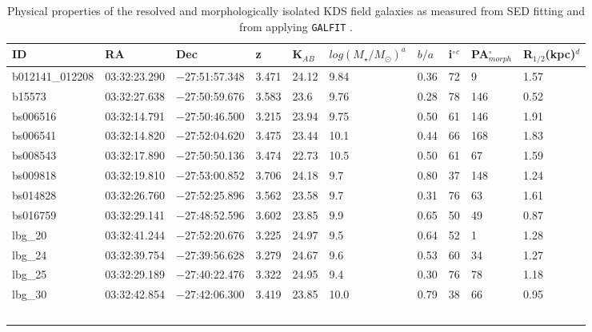 \documentclass[fleqn,usenatbib]{mnras}
\begin{document}
\begin{table*}
\centering
\begin{threeparttable}
\caption{Physical properties of the resolved and morphologically isolated KDS field galaxies as measured from SED fitting and from applying {\tt GALFIT} \protect\citep{Peng2010_galfit}.}
\label{tab:phys-props}
\begin{tabular}{llllllllll}


 \hline
ID              & RA       & Dec       & z     & K$_{AB}$     & $log(M_{\star}/M_{\odot})^{a}$ & $b/a$ & i$^{\circ}$$^{c}$ & PA$_{morph}^{\circ}$ & R$_{1/2}$(kpc)$^{d}$ \\
 \hline
b012141\_012208 & 03:32:23.290 & $-$27:51:57.348 & 3.471        & 24.12  & 9.84 & 0.36        & 72        & 9     & 1.57      \\
b15573          & 03:32:27.638 & $-$27:50:59.676 & 3.583        & 23.6   & 9.76  & 0.28        & 78        & 146   & 0.52      \\
bs006516        & 03:32:14.791 & $-$27:50:46.500 & 3.215        & 23.94  & 9.75 & 0.50         & 61        & 146   & 1.91      \\
bs006541        & 03:32:14.820 & $-$27:52:04.620 & 3.475       & 23.44  & 10.1  & 0.44        & 66        & 168   & 1.83      \\
bs008543        & 03:32:17.890 & $-$27:50:50.136 & 3.474        & 22.73  & 10.5 & 0.50         & 61        & 67    & 1.59      \\
bs009818        & 03:32:19.810 & $-$27:53:00.852 & 3.706        & 24.18  & 9.7  & 0.80         & 37        & 148   & 1.24      \\
bs014828        & 03:32:26.760 & $-$27:52:25.896 & 3.562        & 23.58  & 9.7  & 0.31        & 76        & 63    & 1.61      \\
bs016759        & 03:32:29.141 & $-$27:48:52.596 & 3.602       & 23.85  & 9.9   & 0.65        & 50        & 49    & 0.87      \\
lbg\_20         & 03:32:41.244 & $-$27:52:20.676 & 3.225        & 24.97  & 9.5  & 0.64        & 52        & 1     & 1.28      \\
lbg\_24         & 03:32:39.754 & $-$27:39:56.628 & 3.279       & 24.67  & 9.6   & 0.53        & 60        & 34    & 1.27      \\
lbg\_25         & 03:32:29.189 & $-$27:40:22.476 & 3.322        & 24.95  & 9.4  & 0.30         & 76        & 78    & 1.18      \\
lbg\_30         & 03:32:42.854 & $-$27:42:06.300 & 3.419        & 23.85  & 10.0  & 0.79         & 38        & 66    & 0.95      \\
$$
\end{tabular}
\end{threeparttable}
\end{table*}
\end{document}
